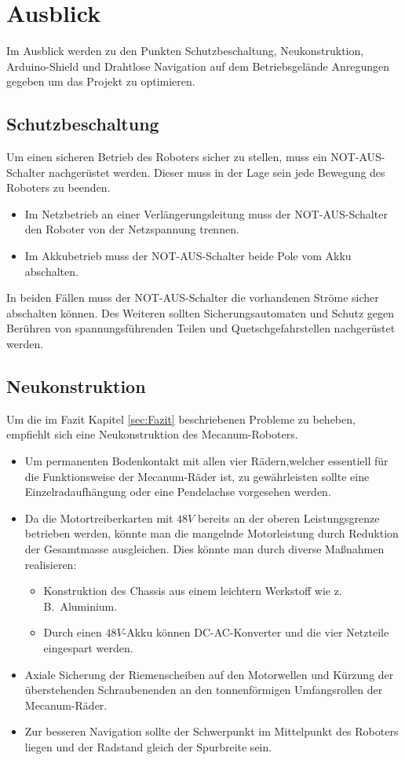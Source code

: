 
\section{Ausblick}
\label{sec:Ausblick}
Im Ausblick werden zu den Punkten Schutzbeschaltung, Neukonstruktion, Arduino-Shield und Drahtlose Navigation auf dem Betriebsgelände Anregungen gegeben um das Projekt zu optimieren.

\subsection{Schutzbeschaltung}
\label{sec:Schutzbeschaltung}
Um einen sicheren Betrieb des Roboters sicher zu stellen, muss ein NOT-AUS-Schalter nachgerüstet werden. Dieser muss in der Lage sein jede Bewegung des Roboters zu beenden.
\begin{itemize}
\item{Im Netzbetrieb an einer Verlängerungsleitung muss der NOT-AUS-Schalter den Roboter von der Netzspannung trennen.}
\item{Im Akkubetrieb muss der NOT-AUS-Schalter beide Pole vom Akku abschalten.}
\end{itemize}
In beiden Fällen muss der NOT-AUS-Schalter die vorhandenen Ströme sicher abschalten können. Des Weiteren sollten Sicherungsautomaten und Schutz gegen Berühren von spannungsführenden Teilen und Quetschgefahrstellen nachgerüstet werden.

\subsection{Neukonstruktion}
\label{sec:Neukonstruktion}
Um die im Fazit Kapitel \ref{sec:Fazit} beschriebenen Probleme zu beheben, empfiehlt sich eine Neukonstruktion des Mecanum-Roboters.
\begin{itemize}
\item{Um permanenten Bodenkontakt mit allen vier Rädern,welcher essentiell für die Funktionsweise der Mecanum-Räder ist, zu gewährleisten sollte eine Einzelradaufhängung oder eine Pendelachse vorgesehen werden.}
\item{Da die Motortreiberkarten mit $48V$ bereits an der oberen Leistungsgrenze betrieben werden, könnte man die mangelnde Motorleistung durch Reduktion der Gesamtmasse ausgleichen. Dies könnte man durch diverse Maßnahmen realisieren:
\begin {itemize}
\item{Konstruktion des Chassis aus einem leichtern Werkstoff wie z.\,B.\ Aluminium.}
\item{Durch einen $48V$-Akku können DC-AC-Konverter und die vier Netzteile eingespart werden.}
\end{itemize}
}
\item{Axiale Sicherung der Riemenscheiben auf den Motorwellen und Kürzung der überstehenden Schraubenenden an den tonnenförmigen Umfangsrollen der Mecanum-Räder.}
\item{Zur besseren Navigation sollte der Schwerpunkt im Mittelpunkt des Roboters liegen und der Radstand gleich der Spurbreite sein.}
\end{itemize}

